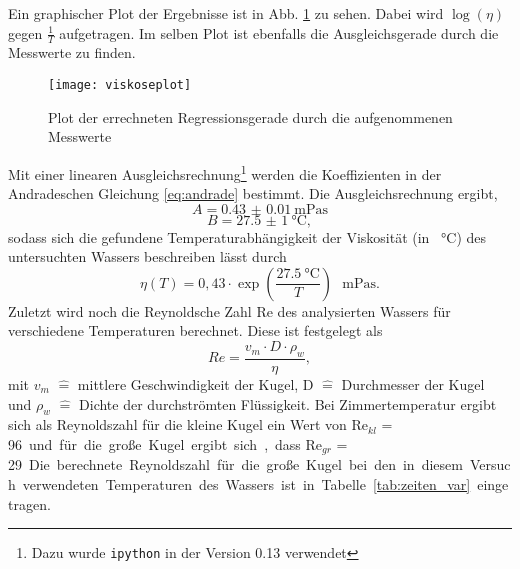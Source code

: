 Ein graphischer Plot der Ergebnisse ist in Abb. \ref{fig:viskoseplot} zu
sehen. Dabei wird $\log{(\eta)}$ gegen $\frac{1}{T}$ aufgetragen. Im
selben Plot ist ebenfalls die Ausgleichsgerade durch die Messwerte zu
finden.
%
\begin{figure}[h]
\centering
\texttt{[image: viskoseplot]}
\caption{Plot der errechneten Regressionsgerade durch die aufgenommenen Messwerte}
\label{fig:viskoseplot}
\end{figure}
%
Mit einer linearen Ausgleichsrechnung\footnote{Dazu wurde \texttt{ipython} in der Version 0.13  verwendet} werden die Koeffizienten in der Andradeschen Gleichung \eqref{eq:andrade} bestimmt. Die Ausgleichsrechnung ergibt,
\begin{equation*}
A = \SI{0.43(1)}{\milli\pascal\second}
\end{equation*}
\begin{equation*}
B = \SI{27.5(10)}{\celsius},
\end{equation*}
sodass sich die gefundene Temperaturabhängigkeit der Viskosität (in \SI{}{\celsius}) des untersuchten Wassers beschreiben lässt durch
\begin{equation*}
\eta(T) = 0,43 \cdot \exp{\left(\frac{\SI{27.5}{\celsius}}{T}\right)} \text{ }\si{\milli\pascal\second}.
\end{equation*}
%
Zuletzt wird noch die Reynoldsche Zahl Re des analysierten Wassers für verschiedene Temperaturen berechnet. Diese ist festgelegt als
\begin{equation*}
Re = \frac{v_m \cdot D \cdot \rho_{w}}{\eta},
\end{equation*}
mit $v_m$ $\hat{=}$ mittlere Geschwindigkeit der Kugel, D $\hat{=}$
Durchmesser der Kugel und $\rho_{w}$ $\hat{=}$ Dichte der durchströmten
Flüssigkeit. Bei Zimmertemperatur ergibt sich als Reynoldszahl für die
kleine Kugel ein Wert von $\text{Re}_{kl}$ = \SI{96} und für die große
Kugel ergibt sich, dass $\text{Re}_{gr}$ = \SI{29}.
Die berechnete Reynoldszahl für die große Kugel bei den in diesem Versuch verwendeten Temperaturen des Wassers ist in Tabelle \ref{tab:zeiten_var} eingetragen.
%